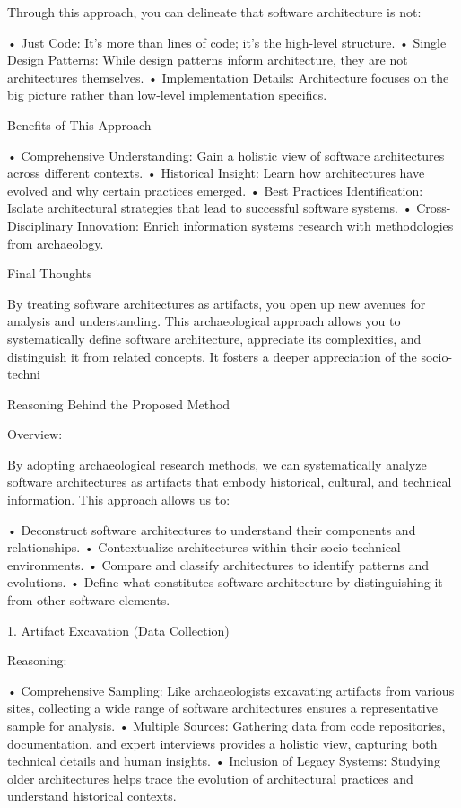 Through this approach, you can delineate that software architecture is not:

	•	Just Code: It’s more than lines of code; it’s the high-level structure.
	•	Single Design Patterns: While design patterns inform architecture, they are not architectures themselves.
	•	Implementation Details: Architecture focuses on the big picture rather than low-level implementation specifics.

Benefits of This Approach

	•	Comprehensive Understanding: Gain a holistic view of software architectures across different contexts.
	•	Historical Insight: Learn how architectures have evolved and why certain practices emerged.
	•	Best Practices Identification: Isolate architectural strategies that lead to successful software systems.
	•	Cross-Disciplinary Innovation: Enrich information systems research with methodologies from archaeology.

Final Thoughts

By treating software architectures as artifacts, you open up new avenues for analysis and understanding. This archaeological approach allows you to systematically define software architecture, appreciate its complexities, and distinguish it from related concepts. It fosters a deeper appreciation of the socio-techni



Reasoning Behind the Proposed Method

Overview:

By adopting archaeological research methods, we can systematically analyze software architectures as artifacts that embody historical, cultural, and technical information. This approach allows us to:

	•	Deconstruct software architectures to understand their components and relationships.
	•	Contextualize architectures within their socio-technical environments.
	•	Compare and classify architectures to identify patterns and evolutions.
	•	Define what constitutes software architecture by distinguishing it from other software elements.

1. Artifact Excavation (Data Collection)

Reasoning:

	•	Comprehensive Sampling: Like archaeologists excavating artifacts from various sites, collecting a wide range of software architectures ensures a representative sample for analysis.
	•	Multiple Sources: Gathering data from code repositories, documentation, and expert interviews provides a holistic view, capturing both technical details and human insights.
	•	Inclusion of Legacy Systems: Studying older architectures helps trace the evolution of architectural practices and understand historical contexts.

